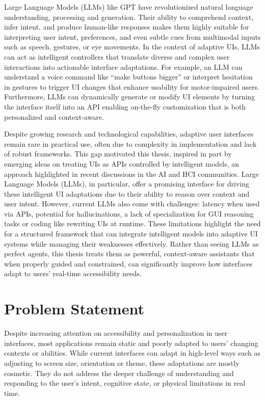 \documentclass[openany]{book}
\begin{document}
Large Language Models (LLMs) like GPT have revolutionized natural language understanding, processing and generation. Their ability to comprehend context, infer intent, and produce human-like responses makes them highly suitable for interpreting user intent, preferences, and even subtle cues from multimodal inputs such as speech, gestures, or eye movements.
In the context of adaptive UIs, LLMs can act as intelligent controllers that translate diverse and complex user interactions into actionable interface adaptations. For example, an LLM can understand a voice command like “make buttons bigger” or interpret hesitation in gestures to trigger UI changes that enhance usability for motor-impaired users. Furthermore, LLMs can dynamically generate or modify UI elements by turning the interface itself into an API enabling on-the-fly customization that is both personalized and context-aware.

Despite growing research and technological capabilities, adaptive user interfaces remain rare in practical use, often due to complexity in implementation and lack of robust frameworks. This gap motivated this thesis, inspired in part by emerging ideas on treating UIs as APIs controlled by intelligent models, an approach highlighted in recent discussions in the AI and HCI communities. Large Language Models (LLMs), in particular, offer a promising interface for driving these intelligent UI adaptations due to their ability to reason over context and user intent. However, current LLMs also come with challenges: latency when used via APIs, potential for hallucinations, a lack of specialization for GUI reasoning tasks or coding like rewriting UIs at runtime. These limitations highlight the need for a structured framework that can integrate intelligent models into adaptive UI systems while managing their weaknesses effectively. Rather than seeing LLMs as perfect agents, this thesis treats them as powerful, context-aware assistants that when properly guided and constrained, can significantly improve how interfaces adapt to users' real-time accessibility needs.
\section{Problem Statement}
Despite increasing attention on accessibility and personalization in user interfaces, most applications remain static and poorly adapted to users' changing contexts or abilities. While current interfaces can adapt in high-level ways such as adjusting to screen size, orientation or theme, these adaptations are mostly cosmetic. They do not address the deeper challenge of understanding and responding to the user's intent, cognitive state, or physical limitations in real time.
\end{document}
